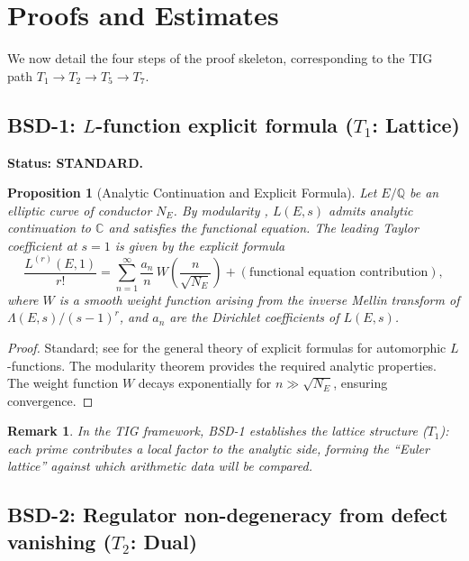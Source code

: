 \documentclass[11pt]{article}
\newtheorem{proposition}[theorem]{Proposition}
\newtheorem{remark}[theorem]{Remark}
\begin{document}
\section{Proofs and Estimates}
\label{sec:proofs}

We now detail the four steps of the proof skeleton, corresponding to the TIG
path $T_1 \to T_2 \to T_5 \to T_7$.

\subsection{BSD-1: $L$-function explicit formula ($T_1$: Lattice)}

\textbf{Status: STANDARD.}

\begin{proposition}[Analytic Continuation and Explicit Formula]
\label{prop:bsd1}
Let $E/\mathbb{Q}$ be an elliptic curve of conductor $N_E$.  By modularity
\cite{Wiles, BCDT}, $L(E,s)$ admits analytic continuation to $\mathbb{C}$ and
satisfies the functional equation.  The leading Taylor coefficient at $s = 1$ is
given by the explicit formula
\[
  \frac{L^{(r)}(E,1)}{r!} =
  \sum_{n=1}^{\infty} \frac{a_n}{n}\, W\!\left(\frac{n}{\sqrt{N_E}}\right)
  + (\text{functional equation contribution}),
\]
where $W$ is a smooth weight function arising from the inverse Mellin transform
of $\Lambda(E,s)/(s-1)^r$, and $a_n$ are the Dirichlet coefficients of $L(E,s)$.
\end{proposition}

\begin{proof}
Standard; see \cite{IK} for the general theory of explicit formulas for
automorphic $L$-functions.  The modularity theorem provides the required analytic
properties.  The weight function $W$ decays exponentially for $n \gg \sqrt{N_E}$,
ensuring convergence.
\end{proof}

\begin{remark}
In the TIG framework, BSD-1 establishes the \emph{lattice structure} ($T_1$):
each prime contributes a local factor to the analytic side, forming the
``Euler lattice'' against which arithmetic data will be compared.
\end{remark}

\subsection{BSD-2: Regulator non-degeneracy from defect vanishing ($T_2$: Dual)}
\end{document}
